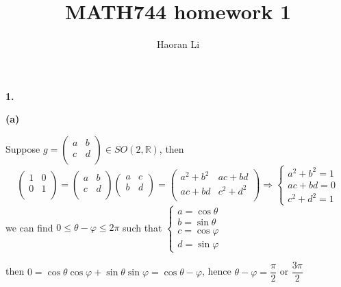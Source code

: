 \documentclass[10pt]{article}
\title{MATH744 homework 1}
\author{Haoran Li}
\date{}
\newcommand{\<}[1]{\langle #1 \rangle}
\begin{document}
\maketitle

\textbf{1.} \par
\textbf{(a)} \par
Suppose $g=\left( {\begin{array}{cc}
   a & b \\
   c & d \\
  \end{array} } \right) \in SO(2,\mathbb{R})$, then 
  $$\left( {\begin{array}{cc}
   1 & 0 \\
   0 & 1 \\
  \end{array} } \right)=\left( {\begin{array}{cc}
   a & b \\
   c & d \\
  \end{array} } \right)\left( {\begin{array}{cc}
   a & c \\
   b & d \\
  \end{array} } \right)=\left( {\begin{array}{cc}
   a^2+b^2 & ac+bd \\
   ac+bd & c^2+d^2 \\
  \end{array} } \right)\Rightarrow \begin{cases}
  a^2+b^2=1 \\
  ac+bd=0 \\
  c^2+d^2=1
  \end{cases}$$
 we can find $0\leq\theta-\varphi\leq2\pi$ such that $\begin{cases}
  a=\cos{\theta} \\
  b=\sin{\theta} \\
  c=\cos{\varphi} \\
  d=\sin{\varphi}
  \end{cases}$ \par
then $0=\cos{\theta}\cos{\varphi}+\sin{\theta}\sin{\varphi}=\cos{\theta-\varphi}$, hence $\theta-\varphi=\dfrac{\pi}{2}$ or $\dfrac{3\pi}{2}$ \par
\end{document}
